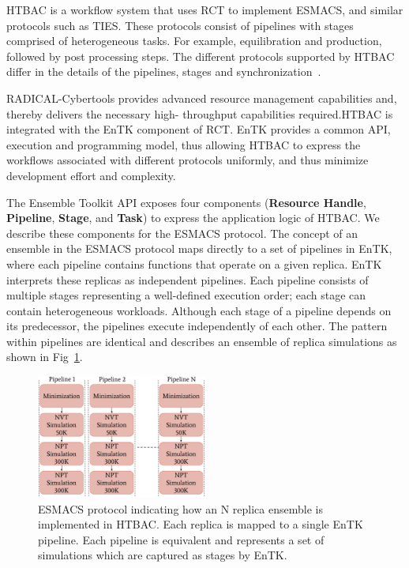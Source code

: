 
HTBAC is a workflow system that uses RCT to implement ESMACS, and similar
protocols such as TIES\@. These protocols consist of pipelines with stages
comprised of heterogeneous tasks. For example, equilibration and production,
followed by post processing steps. The different protocols supported by HTBAC
differ in the details of the pipelines, stages and
synchronization~\cite{Bhati2017}.


RADICAL-Cybertools provides advanced resource management capabilities and,
thereby delivers the necessary high- throughput capabilities required.HTBAC is
integrated with the EnTK component of RCT. EnTK provides a common API,
execution and programming model, thus allowing HTBAC to express the workflows
associated with different protocols uniformly, and thus minimize development
effort and complexity.

The Ensemble Toolkit API exposes four components (\textbf{Resource Handle},
\textbf{Pipeline}, \textbf{Stage}, and \textbf{Task}) to express the
application logic of HTBAC\@. We describe these components for the ESMACS
protocol\@. The concept of an ensemble in the ESMACS protocol maps directly to 
a set of pipelines in EnTK, where each pipeline contains functions that operate 
on a given replica. EnTK interprets these replicas as independent pipelines. 
Each pipeline consists of multiple stages representing a well-defined execution 
order; each stage can contain heterogeneous workloads. Although each stage of a 
pipeline depends on its predecessor, the pipelines execute independently of each 
other. The pattern within pipelines are identical and describes an ensemble of replica
simulations as shown in Fig~\ref{figure:ESMACS-pipelines}.


\begin{figure}
\centering
  \includegraphics[width=0.5\textwidth]{FIGURES/HT-BAC_NAMD_pipelines_control_flow_only.pdf}
  \caption{ESMACS protocol indicating how an N replica ensemble is implemented in HTBAC.
  Each replica is mapped to a single EnTK pipeline. 
  Each pipeline is equivalent and represents a set of simulations which are captured as stages by
  EnTK.}\label{figure:ESMACS-pipelines}
\end{figure}


